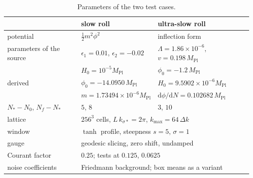 \begin{table}
\caption{\label{tab:parameters}Parameters of the two test cases.}
\begin{ruledtabular}
\footnotesize
\begin{tabular}{lll}
 & slow roll & ultra-slow roll \\
\hline
potential & $\tfrac12 m^2\phi^2$ & inflection form \\
parameters of the source & $\epsilon_1=0.01$, $\epsilon_2=-0.02$ & $\Lambda=1.86\times10^{-6}$, $v=0.198\,M_\mathrm{Pl}$ \\
 & $H_0=10^{-5}M_\mathrm{Pl}$ & $\phi_0=-1.2\,M_\mathrm{Pl}$ \\
derived & $\phi_0=-14.0950\,M_\mathrm{Pl}$ & $H_0=9.5902\times10^{-6}M_\mathrm{Pl}$ \\
 & $m=1.73494\times10^{-6}M_\mathrm{Pl}$ & $\mathrm{d}\phi/\mathrm{d}N=0.102682\,M_\mathrm{Pl}$ \\
$N_*-N_0$, $N_f-N_*$ & $5$, $8$ & $3$, $10$ \\
lattice & \multicolumn{2}{l}{$256^3$ cells, $L\,k_{\sigma*}=2\pi$, $k_\mathrm{max}=64\,\Delta k$} \\
window & \multicolumn{2}{l}{$\tanh$ profile, steepness $s=5$, $\sigma=1$} \\
gauge & \multicolumn{2}{l}{geodesic slicing, zero shift, undamped} \\
Courant factor & \multicolumn{2}{l}{$0.25$; tests at $0.125$, $0.0625$} \\
noise coefficients & \multicolumn{2}{l}{Friedmann background; box means as a variant} \\
\end{tabular}
\end{ruledtabular}
\end{table}
